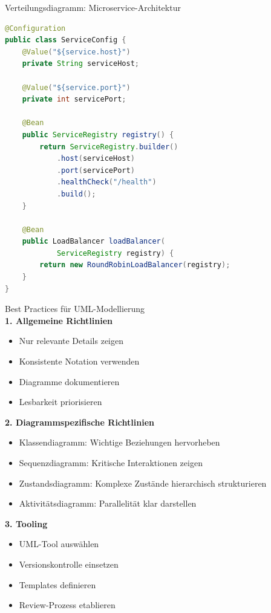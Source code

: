 \begin{example2}{Verteilungsdiagramm: Microservice-Architektur}
\begin{lstlisting}[language=Java, style=basesmol]
@Configuration
public class ServiceConfig {
    @Value("${service.host}")
    private String serviceHost;
    
    @Value("${service.port}")
    private int servicePort;
    
    @Bean
    public ServiceRegistry registry() {
        return ServiceRegistry.builder()
            .host(serviceHost)
            .port(servicePort)
            .healthCheck("/health")
            .build();
    }
    
    @Bean
    public LoadBalancer loadBalancer(
            ServiceRegistry registry) {
        return new RoundRobinLoadBalancer(registry);
    }
}
\end{lstlisting}
\end{example2}

\columnbreak

\begin{KR}{Best Practices für UML-Modellierung}\\
\textbf{1. Allgemeine Richtlinien}
\begin{itemize}
    \item Nur relevante Details zeigen
    \item Konsistente Notation verwenden
    \item Diagramme dokumentieren
    \item Lesbarkeit priorisieren
\end{itemize}

\textbf{2. Diagrammspezifische Richtlinien}
\begin{itemize}
    \item Klassendiagramm: Wichtige Beziehungen hervorheben
    \item Sequenzdiagramm: Kritische Interaktionen zeigen
    \item Zustandsdiagramm: Komplexe Zustände hierarchisch strukturieren
    \item Aktivitätsdiagramm: Parallelität klar darstellen
\end{itemize}

\textbf{3. Tooling}
\begin{itemize}
    \item UML-Tool auswählen
    \item Versionskontrolle einsetzen
    \item Templates definieren
    \item Review-Prozess etablieren
\end{itemize}
\end{KR}












